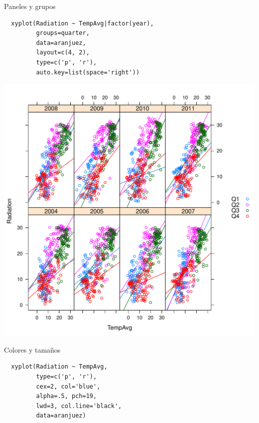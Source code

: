 \documentclass[xcolor={usenames,svgnames,dvipsnames}]{beamer}
\begin{document}
\begin{frame}[fragile,label=sec-2-1-16]{Paneles y grupos}
 \lstset{language=R,label= ,caption= ,numbers=none}
\begin{lstlisting}
  xyplot(Radiation ~ TempAvg|factor(year),
         groups=quarter,
         data=aranjuez,
         layout=c(4, 2),
         type=c('p', 'r'),
         auto.key=list(space='right'))
\end{lstlisting}
\end{frame}

\begin{frame}[label=sec-2-1-17]{}
\includegraphics[width=.9\linewidth]{figs/xyplotQuarterYearSmooth.pdf}
\end{frame}

\begin{frame}[fragile,label=sec-2-1-18]{Colores y tamaños}
 \lstset{language=R,label= ,caption= ,numbers=none}
\begin{lstlisting}
  xyplot(Radiation ~ TempAvg,
         type=c('p', 'r'),
         cex=2, col='blue',
         alpha=.5, pch=19,
         lwd=3, col.line='black',
         data=aranjuez)
\end{lstlisting}
\end{frame}
\end{document}
